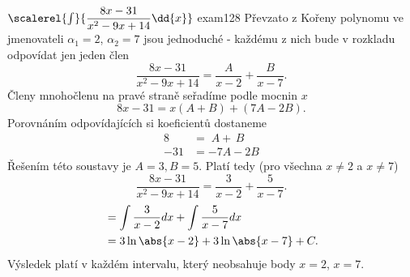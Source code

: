 \begin{mathexam}{\(\scalerel{\int}{\dfrac{8x-31}{x^2-9x+14}\dd{x}}\) \hfill
  \cite[s.~90]{Knichal}}{exam128} 
  Převzato z \cite[s.~90]{Knichal} Kořeny polynomu ve jmenovateli $\alpha_1 = 2$, $\alpha_2 = 7$
  jsou jednoduché - každému z nich bude v rozkladu odpovídat jen jeden člen
  $$\frac{8x-31}{x^2-9x+14} = \frac{A}{x-2} + \frac{B}{x-7}.$$ Členy mnohočlenu na pravé straně
  seřadíme podle mocnin $x$ $$8x-31 = x(A+B)+(7A-2B).$$ Porovnáním odpovídajících si koeficientů
  dostaneme
  \begin{align*}
    8   &=   \; A + \, B \\
    -31 &= -7A - 2B
  \end{align*}
  Řešením této soustavy je $A = 3, B = 5$. Platí tedy (pro všechna $x \neq 2$ a $x \neq 7$)
  $$\frac{8x-31}{x^2-9x+14} = \frac{3}{x-2} + \frac{5}{x-7}.$$
  \begin{align*}
      &= \int{\frac{3}{x-2}}dx + \int{\frac{5}{x-7}}dx      \\
      &= 3\ln\abs{x-2} + 3\ln\abs{x-7} + C.
  \end{align*}
  Výsledek platí v každém intervalu, který neobsahuje body \(x = 2\), \(x = 7\).
\end{mathexam}